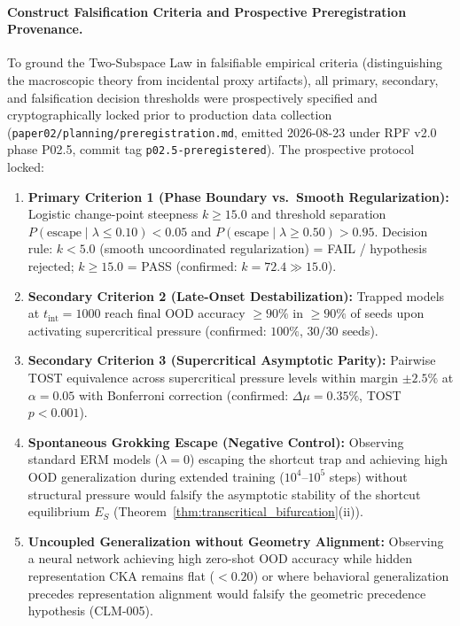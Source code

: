 \documentclass{article}
\theoremstyle{plain}
\theoremstyle{definition}
\begin{document}
\paragraph{Construct Falsification Criteria and Prospective Preregistration Provenance.}
\label{sec:falsification_criteria}
To ground the Two-Subspace Law in falsifiable empirical criteria (distinguishing the macroscopic theory from incidental proxy artifacts), all primary, secondary, and falsification decision thresholds were prospectively specified and cryptographically locked prior to production data collection (\texttt{paper02/planning/preregistration.md}, emitted 2026-08-23 under RPF v2.0 phase P02.5, commit tag \texttt{p02.5-preregistered}). The prospective protocol locked:
\begin{enumerate}[leftmargin=*,noitemsep]
    \item \textbf{Primary Criterion 1 (Phase Boundary vs.\ Smooth Regularization):} Logistic change-point steepness $k \ge 15.0$ and threshold separation $P(\text{escape} \mid \lambda \le 0.10) < 0.05$ and $P(\text{escape} \mid \lambda \ge 0.50) > 0.95$. Decision rule: $k < 5.0$ (smooth uncoordinated regularization) = FAIL / hypothesis rejected; $k \ge 15.0$ = PASS (confirmed: $k = 72.4 \gg 15.0$).
    \item \textbf{Secondary Criterion 2 (Late-Onset Destabilization):} Trapped models at $t_{\text{int}} = 1000$ reach final OOD accuracy $\ge 90\%$ in $\ge 90\%$ of seeds upon activating supercritical pressure (confirmed: $100\%$, $30/30$ seeds).
    \item \textbf{Secondary Criterion 3 (Supercritical Asymptotic Parity):} Pairwise TOST equivalence across supercritical pressure levels within margin $\pm 2.5\%$ at $\alpha = 0.05$ with Bonferroni correction (confirmed: $\Delta \mu = 0.35\%$, TOST $p < 0.001$).
    \item \textbf{Spontaneous Grokking Escape (Negative Control):} Observing standard ERM models ($\lambda = 0$) escaping the shortcut trap and achieving high OOD generalization during extended training ($10^4$--$10^5$ steps) without structural pressure would falsify the asymptotic stability of the shortcut equilibrium $E_S$ (Theorem~\ref{thm:transcritical_bifurcation}(ii)).
    \item \textbf{Uncoupled Generalization without Geometry Alignment:} Observing a neural network achieving high zero-shot OOD accuracy while hidden representation CKA remains flat ($< 0.20$) or where behavioral generalization precedes representation alignment would falsify the geometric precedence hypothesis (CLM-005).
\end{enumerate}
\end{document}

